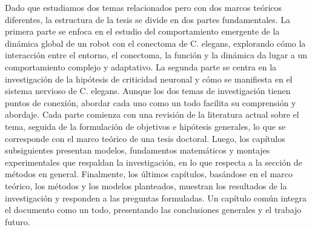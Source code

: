 Dado que estudiamos dos temas relacionados pero con dos marcos teóricos diferentes, la estructura de la tesis se divide en dos partes fundamentales. La primera parte se enfoca en el estudio del comportamiento emergente de la dinámica global de un robot con el conectoma de C. elegans, explorando cómo la interacción entre el entorno, el conectoma, la función y la dinámica da lugar a un comportamiento complejo y adaptativo. La segunda parte se centra en la investigación de la hipótesis de criticidad neuronal y cómo se manifiesta en el sistema nervioso de C. elegans. Aunque los dos temas de investigación tienen puntos de conexión, abordar cada uno como un todo facilita su comprensión y abordaje. Cada parte comienza con una revisión de la literatura actual sobre el tema, seguida de la formulación de objetivos e hipótesis generales, lo que se corresponde con el marco teórico de una tesis doctoral. Luego, los capítulos subsiguientes presentan modelos, fundamentos matemáticos y montajes experimentales que respaldan la investigación, en lo que respecta a la sección de métodos en general. Finalmente, los últimos capítulos, basándose en el marco teórico, los métodos y los modelos planteados, muestran los resultados de la investigación y responden a las preguntas formuladas. Un capítulo común integra el documento como un todo, presentando las conclusiones generales y el trabajo futuro.
